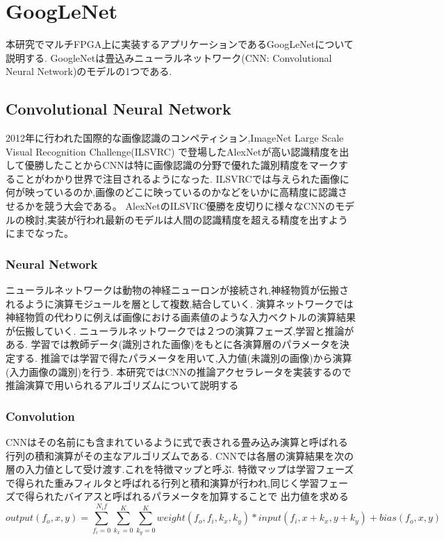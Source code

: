 \chapter{GoogLeNet}
{
\label{chap:googlenet}
本研究でマルチFPGA上に実装するアプリケーションであるGoogLeNetについて説明する.
GoogleNetは畳込みニューラルネットワーク(CNN: Convolutional Neural Network)のモデルの1つである.

\section{Convolutional Neural Network}
\label{sec:cnn}
2012年に行われた国際的な画像認識のコンペティション,ImageNet Large Scale Visual Recognition Challenge(ILSVRC)
で登場したAlexNet\cite{alexnet}が高い認識精度を出して優勝したことからCNNは特に画像認識の分野で優れた識別精度をマークすることがわかり世界で注目されるようになった.
ILSVRCでは与えられた画像に何が映っているのか,画像のどこに映っているのかなどをいかに高精度に認識させるかを競う大会である。
AlexNetのILSVRC優勝を皮切りに様々なCNNのモデルの検討,実装が行われ最新のモデルは人間の認識精度を超える精度を出すようにまでなった。

\subsection{Neural Network}
\label{sec:nn}
ニューラルネットワークは動物の神経ニューロンが接続され,神経物質が伝搬されるように演算モジュールを層として複数,結合していく.
演算ネットワークでは神経物質の代わりに例えば画像における画素値のような入力ベクトルの演算結果が伝搬していく.
ニューラルネットワークでは２つの演算フェーズ,学習と推論がある.
学習では教師データ(識別された画像)をもとに各演算層のパラメータを決定する.
推論では学習で得たパラメータを用いて,入力値(未識別の画像)から演算(入力画像の識別)を行う.
本研究ではCNNの推論アクセラレータを実装するので推論演算で用いられるアルゴリズムについて説明する

\subsection{Convolution}
\label{sec:conv}
CNNはその名前にも含まれているように式で表される畳み込み演算と呼ばれる行列の積和演算がその主なアルゴリズムである.
CNNでは各層の演算結果を次の層の入力値として受け渡す.これを特徴マップと呼ぶ.
特徴マップは学習フェーズで得られた重みフィルタと呼ばれる行列と積和演算が行われ,同じく学習フェーズで得られたバイアスと呼ばれるパラメータを加算することで
出力値を求める
\begin{equation}
	output(f_o, x, y) = \sum_{f_i = 0}^{N_if}\sum_{k_x = 0}^{K}\sum_{k_y = 0}^{K}weight(f_o, f_i,k_x,k_y) * input(f_i,x + k_x, y + k_y) + bias(f_o, x, y)
\end{equation}

}
